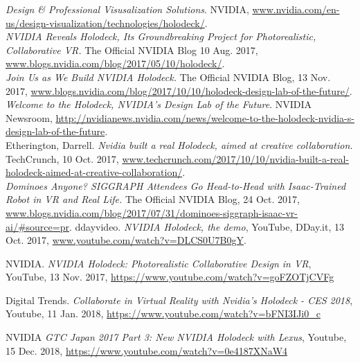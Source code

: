\documentclass[11pt]{article}
\begin{document}
\newpage
\begin{thebibliography}{10}
\textit{Design \& Professional Visusalization Solutions}. NVIDIA, \url{www.nvidia.com/en-us/design-visualization/technologies/holodeck/}.\\
 
\textit{NVIDIA Reveals Holodeck, Its Groundbreaking Project for Photorealistic, Collaborative VR.} 
The Official NVIDIA Blog 10 Aug. 2017, \url{www.blogs.nvidia.com/blog/2017/05/10/holodeck/}.\\

\textit{Join Us as We Build NVIDIA Holodeck.} The Official NVIDIA Blog, 13 Nov. 2017, \url{www.blogs.nvidia.com/blog/2017/10/10/holodeck-design-lab-of-the-future/}.\\
 
\textit{Welcome to the Holodeck, NVIDIA's Design Lab of the Future}. NVIDIA Newsroom, \url{http://nvidianews.nvidia.com/news/welcome-to-the-holodeck-nvidia-s-design-lab-of-the-future}.\\

Etherington, Darrell. \textit{Nvidia built a real Holodeck, aimed at creative collaboration.} TechCrunch, 10 Oct. 2017, \url{www.techcrunch.com/2017/10/10/nvidia-built-a-real-holodeck-aimed-at-creative-collaboration/}.\\

\textit{Dominoes Anyone? SIGGRAPH Attendees Go Head-to-Head with Isaac-Trained Robot in VR and Real Life.} The Official NVIDIA Blog, 24 Oct. 2017, \url{www.blogs.nvidia.com/blog/2017/07/31/dominoes-siggraph-isaac-vr-ai/#source=pr}.
ddayvideo. \textit{NVIDIA Holodeck, the demo}, YouTube, DDay.it, 13 Oct. 2017, \url{www.youtube.com/watch?v=DLCS0U7B0gY}.

NVIDIA. \textit{NVIDIA Holodeck: Photorealistic Collaborative Design in VR}, YouTube, 13 Nov. 2017, \url{https://www.youtube.com/watch?v=goFZOTjCVFg}

Digital Trends. \textit{Collaborate in Virtual Reality with Nvidia's Holodeck - CES 2018}, Youtube, 11 Jan. 2018, \url{https://www.youtube.com/watch?v=bFNI3IJi0_c}

NVIDIA \textit{GTC Japan 2017 Part 3: New NVIDIA Holodeck with Lexus}, Youtube, 15 Dec. 2018, \url{https://www.youtube.com/watch?v=0e4187XNaW4}

\end{thebibliography}
\end{document}
